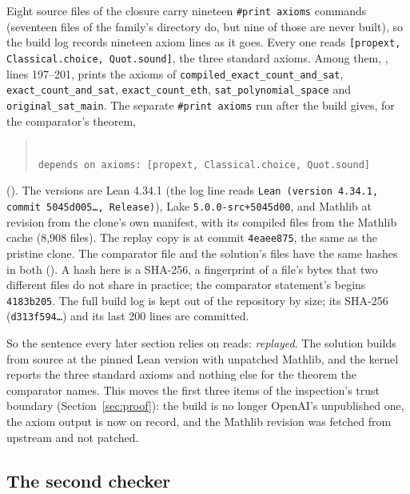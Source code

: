 Eight source files of the closure carry nineteen \texttt{\#print
axioms} commands (seventeen files of the family's directory do, but
nine of those are never built), so the build log records nineteen
axiom lines as it goes. Every one reads
\texttt{[propext, Classical.choice, Quot.sound]}, the three standard
axioms. Among them, , lines 197--201,
prints the axioms of \texttt{compiled\_exact\_count\_and\_sat},
\texttt{exact\_count\_and\_sat}, \texttt{exact\_count\_eth},
\texttt{sat\_polynomial\_space} and \texttt{original\_sat\_main}. The
separate \texttt{\#print axioms} run after the build gives, for the
comparator's theorem,
\begin{quote}\small
{}\\
\texttt{depends on axioms: [propext, Classical.choice, Quot.sound]}
\end{quote}
(). The versions are Lean 4.34.1 (the log line reads \texttt{Lean (version
4.34.1, commit 5045d005…, Release)}), Lake \texttt{5.0.0-src+5045d00},
and Mathlib at revision 
from the clone's own manifest, with its compiled files from the Mathlib cache (8,908 files).
The replay copy is at commit \texttt{4eaee875}, the same as the pristine
clone. The comparator file and the solution's files have the same
hashes in both (). A hash here is a SHA-256, a fingerprint of a file's bytes that two different files do not share in practice; the
comparator statement's begins \texttt{4183b205}. The full build
log is kept out of the repository by size; its SHA-256
(\texttt{d313f594…}) and its last 200 lines are committed.

So the sentence every later section relies on reads: \emph{replayed}.
The solution builds from source at the pinned Lean version with
unpatched Mathlib, and the kernel reports the three standard axioms and
nothing else for the theorem the comparator names. This moves the first
three items of the inspection's trust boundary (Section~\ref{sec:proof}):
the build is no longer OpenAI's unpublished one, the axiom output is now
on record, and the Mathlib revision was fetched from upstream and not
patched.

\subsection{The second checker}


